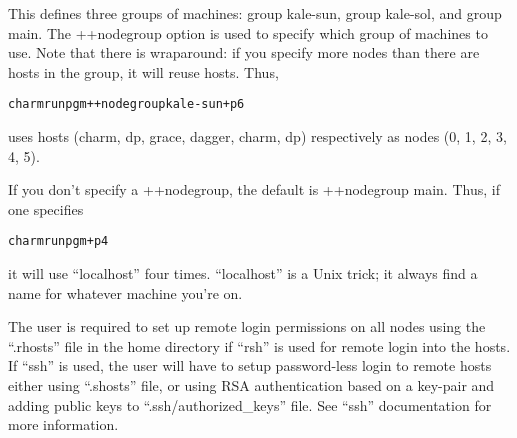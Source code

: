 \documentclass[10pt]{article}
\begin{document}
This defines three groups of machines: group kale-sun, group kale-sol,
and group main.  The ++nodegroup option is used to specify which group
of machines to use.  Note that there is wraparound: if you specify
more nodes than there are hosts in the group, it will reuse
hosts. Thus,

\begin{alltt}
        charmrun pgm ++nodegroup kale-sun +p6
\end{alltt}

uses hosts (charm, dp, grace, dagger, charm, dp) respectively as
nodes (0, 1, 2, 3, 4, 5).

If you don't specify a ++nodegroup, the default is ++nodegroup main.
Thus, if one specifies

\begin{alltt}
        charmrun pgm +p4
\end{alltt}

it will use ``localhost'' four times.  ``localhost'' is a Unix
trick; it always find a name for whatever machine you're on.

The user is required to set up remote login permissions on all nodes using the
``.rhosts'' file in the home directory if ``rsh'' is used for remote login into
the hosts. If ``ssh'' is used, the user will have to setup password-less login
to remote hosts either using ``.shosts'' file, or using RSA authentication
based on a key-pair and adding public keys to ``.ssh/authorized\_keys'' file.
See ``ssh'' documentation for more information.
\end{document}
